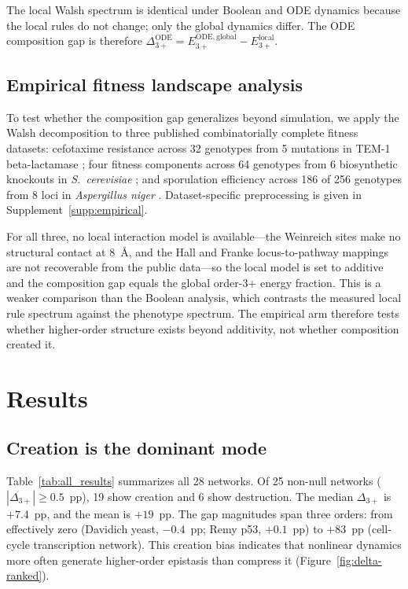 \documentclass[10pt]{article}
\begin{document}
The local Walsh spectrum is identical under Boolean and ODE dynamics
because the local rules do not change; only the global dynamics
differ. The ODE composition gap is therefore
$\Delta_{3+}^{\mathrm{ODE}} = E_{3+}^{\mathrm{ODE,global}} - E_{3+}^{\mathrm{local}}$.


\subsection{Empirical fitness landscape analysis}
\label{sec:empirical-method}

To test whether the composition gap generalizes beyond simulation, we
apply the Walsh decomposition to three published combinatorially
complete fitness datasets: cefotaxime resistance across 32 genotypes
from 5 mutations in TEM-1 beta-lactamase
\citep{weinreich2006darwinian}; four fitness components across 64
genotypes from 6 biosynthetic knockouts in \emph{S.~cerevisiae}
\citep{hall2010fitness}; and sporulation efficiency across 186 of 256
genotypes from 8 loci in \emph{Aspergillus niger}
\citep{franke2011evolutionary}. Dataset-specific preprocessing is given
in Supplement~\ref{supp:empirical}.

For all three, no local interaction model is available---the Weinreich
sites make no structural contact at 8~\AA, and the Hall and Franke
locus-to-pathway mappings are not recoverable from the public
data---so the local model is set to additive and the composition gap
equals the global order-3+ energy fraction. This is a weaker comparison
than the Boolean analysis, which contrasts the measured local rule
spectrum against the phenotype spectrum. The empirical arm therefore
tests whether higher-order structure exists beyond additivity, not
whether composition created it.


\section{Results}
\label{sec:results}

\subsection{Creation is the dominant mode}

Table~\ref{tab:all_results} summarizes all 28 networks. Of 25
non-null networks ($|\Delta_{3+}| \geq 0.5$~pp), 19 show creation
and 6 show destruction. The median $\Delta_{3+}$ is $+7.4$~pp, and
the mean is $+19$~pp. The gap magnitudes span three orders: from
effectively zero (Davidich yeast, $-0.4$~pp; Remy p53, $+0.1$~pp)
to $+83$~pp (cell-cycle transcription network). This creation bias
indicates that nonlinear dynamics more often generate higher-order
epistasis than compress it (Figure~\ref{fig:delta-ranked}).
\end{document}
